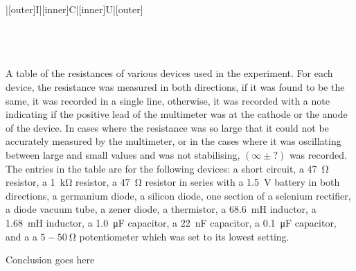 \begin{paper}
{\begin{papertable}{|[outer]I|[inner]C|[inner]U|[outer]}
\papertableindex{}\\\paperiline
\papertableindex{}\\\paperiline
\papertableindex{}\\\paperiline
\papertableindex{}\\\paperoline
\end{papertable}\vspace{-1.5em}}
{A table of the resistances of various devices used in the experiment.
For each device, the resistance was measured in both directions, if it was found to be the same, it was recorded in a single line,
otherwise, it was recorded with a note indicating if the positive lead of the multimeter was at the cathode or the anode of the device.
In cases where the resistance was so large that it could not be accurately measured by the multimeter, or in the cases where it was oscillating between large and small values and was not stabilising, $(\infty\pm?)$ was recorded.
The entries in the table are for the following devices: a short circuit, a \SI{47}{\ohm} resistor, a \SI{1}{\kilo\ohm} resistor, a \SI{47}{\ohm} resistor in series with a \SI{1.5}{\volt} battery in both directions, a germanium diode, a silicon diode, one section of a selenium rectifier, a diode vacuum tube, a zener diode, a thermistor, a \SI{68.6}{\milli\henry} inductor, a \SI{1.68}{\milli\henry} inductor, a \SI{1.0}{\micro\farad} capacitor, a \SI{22}{\nano\farad} capacitor, a \SI{0.1}{\micro\farad} capacitor, and a a $5-\SI{50}{\ohm}$ potentiometer which was set to its lowest setting.}
	
	
	
	

	Conclusion goes here
	


\end{paper}
